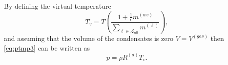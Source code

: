 \documentclass{agujournal}
\begin{document}
{\begin{equation}
\end{equation}
By defining the virtual temperature
\begin{equation}
T_v =T\left( \frac{1+\frac{1}{\epsilon}m^{(wv)}}{\sum_{\ell \in \mathcal{L}_{all}}m^{(\ell)}}\right),\label{eq:tv}
\end{equation}
and assuming that the volume of the condensates is zero $V=V^{(gas)}$ then \eqref{eq:ptmp3} can be written as
\begin{equation}
p=\rho R^{(d)} T_v\label{eq:igl}.
\end{equation}
%
%


}
\end{document}
